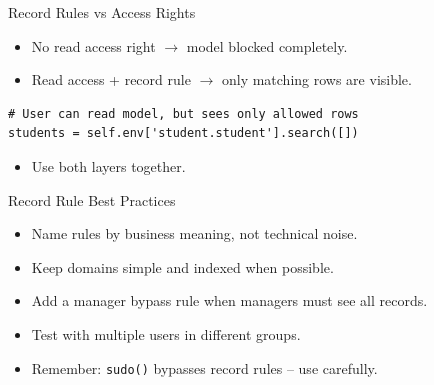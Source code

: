 \begin{frame}[fragile]{Record Rules vs Access Rights}
	\begin{itemize}
		\item No read access right $\rightarrow$ model blocked completely.
		\item Read access + record rule $\rightarrow$ only matching rows are visible.
	\end{itemize}
\begin{lstlisting}
# User can read model, but sees only allowed rows
students = self.env['student.student'].search([])
\end{lstlisting}
	\begin{itemize}
		\item Use both layers together.
	\end{itemize}
\end{frame}

\begin{frame}{Record Rule Best Practices}
	\begin{itemize}
		\item Name rules by business meaning, not technical noise.
		\item Keep domains simple and indexed when possible.
		\item Add a manager bypass rule when managers must see all records.
		\item Test with multiple users in different groups.
		\item Remember: \texttt{sudo()} bypasses record rules -- use carefully.
	\end{itemize}
\end{frame}
